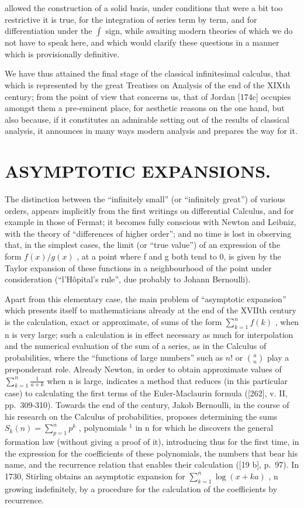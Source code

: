 allowed the construction of a solid basis, under conditions that were a bit too restrictive it is true, for the integration of series term by term, and for differentiation under the \(\int\) sign, while awaiting modern theories of which we do not have to speak here, and which would clarify these questions in a manner which is provisionally definitive.

We have thus attained the final stage of the classical infinitesimal calculus, that which is represented by the great Treatises on Analysis of the end of the XIXth century; from the point of view that concerns us, that of Jordan {[}174c{]} occupies amongst them a pre-eminent place, for aesthetic reasons on the one hand, but also because, if it constitutes an admirable setting out of the results of classical analysis, it announces in many ways modern analysis and prepares the way for it.

\chapter{ASYMPTOTIC EXPANSIONS.}

The distinction between the ``infinitely small'' (or ``infinitely great'') of various orders, appears implicitly from the first writings on differential Calculus, and for example in those of Fermat; it becomes fully conscious with Newton and Leibniz, with the theory of ``differences of higher order''; and no time is lost in observing that, in the simplest cases, the limit (or ``true value'') of an expression of the form \(f(x)/g(x)\) , at a point where f and g both tend to 0, is given by the Taylor expansion of these functions in a neighbourhood of the point under consideration (``l'Hôpital's rule'', due probably to Johann Bernoulli).

Apart from this elementary case, the main problem of ``asymptotic expansion'' which presents itself to mathematicians already at the end of the XVIIth century is the calculation, exact or approximate, of sums of the form \(\sum_{k=1}^{n}f(k)\) , when n is very large; such a calculation is in effect necessary as much for interpolation and the numerical evaluation of the sum of a series, as in the Calculus of probabilities, where the ``functions of large numbers'' such as \(n!\) or \(\binom{a}{n}\) play a preponderant role. Already Newton, in order to obtain approximate values of \(\sum_{k=1}^{n}\frac{1}{a+k}\) when n is large, indicates a method that reduces (in this particular case) to calculating the first terms of the Euler-Maclaurin formula ({[}262{]}, v. II, pp.~309-310). Towards the end of the century, Jakob Bernoulli, in the course of his research on the Calculus of probabilities, proposes determining the sums \(S_{k}(n)=\sum_{p=1}^{n}p^{k}\) , polynomials \(^{1}\) in n for which he discovers the general formation law (without giving a proof of it), introducing thus for the first time, in the expression for the coefficients of these polynomials, the numbers that bear his name, and the recurrence relation that enables their calculation ({[}19 b{]}, p.~97). In 1730, Stirling obtains an asymptotic expansion for \(\sum_{k=1}^{n}\log(x+ka)\) , n growing indefinitely, by a procedure for the calculation of the coefficients by recurrence.

